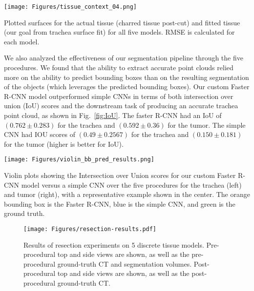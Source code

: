 \vspace{1em}
\begin{figurehere}
    \centering
    \texttt{[image: Figures/tissue\_context\_04.png]}
    \caption{Plotted surfaces for the actual tissue (charred tissue post-cut) and fitted tissue (our goal from trachea surface fit) for all five models. RMSE is calculated for each model.}
    \label{fig:surface-fit}
\end{figurehere}


We also analyzed the effectiveness of our segmentation pipeline through the five procedures. We found that the ability to extract accurate point clouds relied more on the ability to predict bounding boxes than on the resulting segmentation of the objects (which leverages the predicted bounding boxes). Our custom Faster R-CNN model outperformed simple CNNs in terms of both intersection over union (IoU) scores and the downstream task of producing an accurate trachea point cloud, as shown in Fig.~\ref{fig:IoU}. The faster R-CNN had an IoU of $(0.762 \pm 0.283)$ for the trachea and $(0.592 \pm 0.36)$ for the tumor. The simple CNN had IOU scores of $(0.49 \pm 0.2567)$ for the trachea and $(0.150 \pm 0.181)$ for the tumor (higher is better for IoU). 

\begin{figurehere}
    \centering
    \texttt{[image: Figures/violin\_bb\_pred\_results.png]}
    \caption{Violin plots showing the Intersection over Union scores for our custom Faster R-CNN model versus a simple CNN over the five procedures for the trachea (left) and tumor (right), with a representative example shown in the center. The orange bounding box is the Faster R-CNN, blue is the simple CNN, and green is the ground truth. }
    \label{fig:IoU}
\end{figurehere}

\vspace{1em}
\begin{figure*}[ht!]
    \centering
    \texttt{[image: Figures/resection-results.pdf]}
    \caption{Results of resection experiments on 5 discrete tissue models. Pre-procedural top and side views are shown, as well as the pre-procedural ground-truth CT and segmentation volumes. Post-procedural top and side views are shown, as well as the post-procedural ground-truth CT.}
    \label{fig:resection-results}
\end{figure*}
